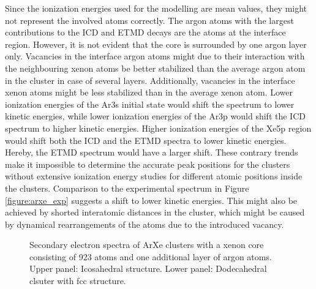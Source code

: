 Since the ionization energies used for the modelling are mean values, they
might not represent the involved atoms correctly. The argon atoms with the
largest contributions to the ICD and ETMD decays are the atoms at the interface
region. However, it is not evident that the core is surrounded by one argon
layer only. Vacancies in the interface argon atoms might due to
their interaction with the
neighbouring xenon atoms be better stabilized than the average argon atom in the
cluster in case of several layers. Additionally, vacancies in the interface
xenon atoms might be less stabilized than in the average xenon atom.
Lower ionization energies of the Ar3s initial state would shift the spectrum
to lower kinetic energies, while lower ionization energies of the Ar3p
would shift the \ac{ICD} spectrum to higher kinetic energies.
Higher ionization energies of the Xe5p region would shift both the ICD and
the ETMD spectra to lower kinetic energies. Hereby, the ETMD spectrum would
have a larger shift. These contrary trends make it impossible to determine the
accurate peak positions for the clusters without extensive ionization energy
studies for different atomic positions inside the clusters.
Comparison to the experimental spectrum in Figure \ref{figure:arxe_exp}
suggests a shift to lower kinetic energies.
This might also be achieved by shorted interatomic distances in the cluster,
which might be caused by dynamical rearrangements of the atoms due to
the introduced vacancy.


\begin{figure}[]
 \centering
 
 
 \caption{Secondary electron spectra of ArXe clusters with a xenon core
          consisting of 923 atoms and one additional layer of argon atoms.\\
          Upper panel: Icosahedral structure. Lower panel: Dodecahedral
          clsuter with fcc structure.}
 \label{figure:exp_923_arxe}
\end{figure}


